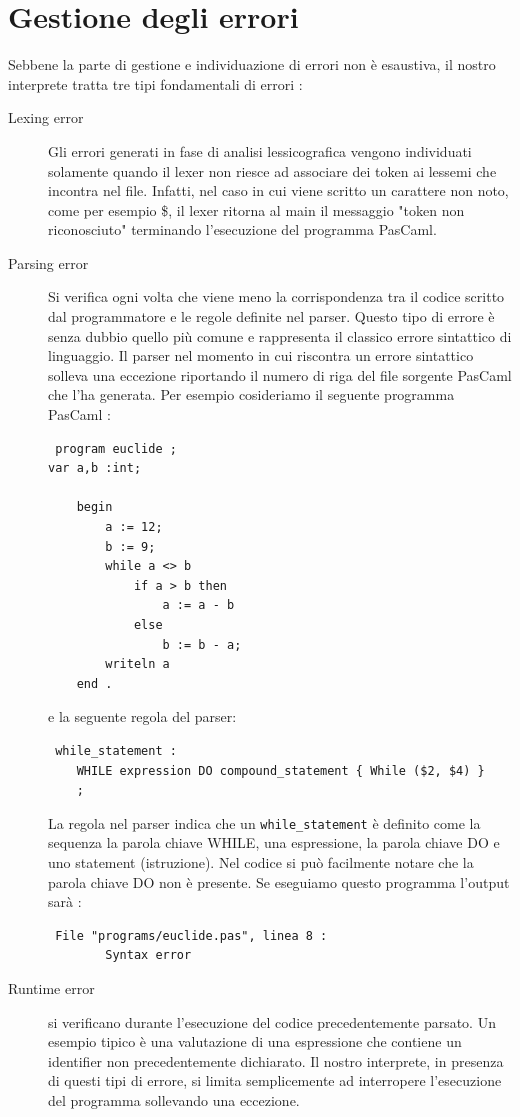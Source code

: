 \documentclass[a4paper,10pt]{article}
\begin{document}
\section{Gestione degli errori}
Sebbene la parte di gestione e individuazione di errori non \`e esaustiva, il
nostro interprete tratta tre tipi fondamentali di errori :
\begin{description}
 \item [Lexing error] Gli errori generati in fase di analisi lessicografica
vengono individuati solamente quando il lexer non riesce ad associare dei token
ai lessemi che incontra nel file. Infatti, nel caso in cui viene scritto un
carattere non noto, come per esempio \$, il lexer ritorna al main il messaggio
"token non riconosciuto" terminando l'esecuzione del programma PasCaml.
\item [Parsing error] Si verifica ogni volta che viene meno la corrispondenza
tra il codice scritto dal programmatore e le regole definite nel parser. Questo
tipo di errore \`e senza dubbio quello pi\`u comune e rappresenta il classico
errore sintattico di linguaggio. Il parser nel momento in cui riscontra un
errore sintattico solleva una eccezione riportando il numero di riga del file
sorgente PasCaml che l'ha generata. Per esempio cosideriamo il seguente
programma PasCaml :
\begin{verbatim}
 program euclide ;
var a,b :int;

    begin
        a := 12;
        b := 9;
        while a <> b
            if a > b then
                a := a - b
            else
                b := b - a;
        writeln a
    end .
\end{verbatim}
e la seguente regola del parser:
\begin{verbatim}
 while_statement :
    WHILE expression DO compound_statement { While ($2, $4) }
    ;
\end{verbatim}
La regola nel parser indica che un \verb|while_statement| \`e definito come la
sequenza 
la parola chiave WHILE, una espressione, la parola chiave DO e uno statement
(istruzione). Nel codice si pu\`o facilmente notare che la parola chiave DO non
\`e presente. Se eseguiamo questo programma l'output sar\`a :
\begin{verbatim}
 File "programs/euclide.pas", linea 8 :
        Syntax error
\end{verbatim}
\item [Runtime error] si verificano durante l'esecuzione del codice
precedentemente parsato. Un esempio tipico \`e una valutazione di una
espressione che contiene un identifier non precedentemente dichiarato. Il nostro
interprete, in presenza di questi tipi di errore, si limita semplicemente ad
interropere l'esecuzione del programma sollevando una eccezione.
\end{description}
\end{document}
